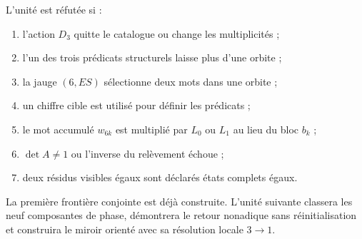 \begin{criterion}
L'unité est réfutée si :
\begin{enumerate}
 \item l'action \(D_3\) quitte le catalogue ou change les multiplicités ;
 \item l'un des trois prédicats structurels laisse plus d'une orbite ;
 \item la jauge \((6,ES)\) sélectionne deux mots dans une orbite ;
 \item un chiffre cible est utilisé pour définir les prédicats ;
 \item le mot accumulé \(w_{6k}\) est multiplié par \(L_0\) ou
       \(L_1\) au lieu du bloc \(b_k\) ;
 \item \(\det A\neq1\) ou l'inverse du relèvement échoue ;
 \item deux résidus visibles égaux sont déclarés états complets égaux.
\end{enumerate}
\end{criterion}

La première frontière conjointe est déjà construite. L'unité suivante
classera les neuf composantes de phase, démontrera le retour nonadique
sans réinitialisation et construira le miroir orienté avec sa résolution locale
\(3\to1\).
